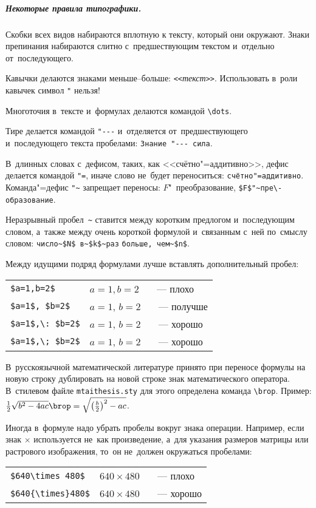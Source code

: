 \subparagraph{Некоторые правила типографики.}
Скобки всех видов набираются вплотную к тексту, который они окружают.
Знаки препинания набираются
слитно с~предшествующим текстом и~отдельно от~последующего.

Кавычки делаются знаками меньше--больше: \verb'<<'\emph{текст}\verb'>>'.
Использовать в~роли кавычек символ \verb'"' нельзя!

Многоточия в~тексте и~формулах делаются командой \verb'\dots'.

Тире делается командой \verb'"---'
и~отделяется от~предшествующего и~последующего текста пробелами:
\verb*'Знание "--- сила'.

В~длинных словах с~дефисом, таких, как <<счётно"=аддитивно>>,
дефис делается командой \verb'"=', иначе слово не~будет переноситься:
\verb'счётно"=аддитивно'.
Команда"=дефис \verb'"~' запрещает переносы:
$F$"~пре\-образование,
\verb'$F$"~пре\-образование'.

Неразрывный пробел~\verb'~' ставится
между коротким предлогом и~последующим словом,
а~также между очень короткой формулой и~связанным с~ней по~смыслу словом:
\verb'число~$N$ в~$k$~раз' \verb'больше, чем~$n$'.

Между идущими подряд формулами лучше вставлять дополнительный пробел:
\begin{center}
\begin{tabular}{l|l}
    \verb'$a=1,b=2$'       & $a=1,b=2$ ~~~--- плохо \\
    \verb'$a=1$, $b=2$'    & $a=1$, $b=2$ ~~~--- получше \\
    \verb'$a=1$,\: $b=2$'  & $a=1$,\: $b=2$  ~~~--- хорошо \\
    \verb'$a=1$,\; $b=2$'  & $a=1$,\; $b=2$  ~~~--- хорошо
\end{tabular}
\end{center}

В~русскоязычной математической литературе принято
при переносе формулы на новую строку дублировать на новой строке знак математического оператора.
В~стилевом файле \verb|mtaithesis.sty| для этого определена команда \verb|\brop|.
Пример:
$\frac12 \sqrt{b^2-4ac} \brop= \sqrt{\bigl(\tfrac b2\bigr)^2 - ac}$.

Иногда в~формуле надо убрать пробелы вокруг знака операции.
Например, если знак $\times$ используется не~как произведение,
а~для указания размеров матрицы или растрового изображения,
то~он не~должен окружаться пробелами:
\begin{center}
\begin{tabular}{l|l}
    \verb'$640\times 480$'  & $640\times 480$ ~~~--- плохо \\
    \verb'$640{\times}480$' & $640{\times}480$ ~~~--- хорошо
\end{tabular}
\end{center}

